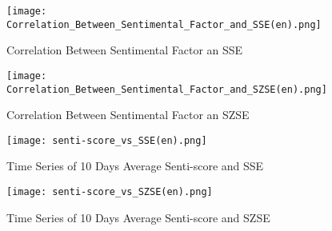 \documentclass[10pt, conference, compsocconf]{IEEEtran}
\begin{document}
\newpage
\begin{figure}[ht]
\begin{minipage}[t]{1\linewidth}
\centering
\texttt{[image: Correlation\_Between\_Sentimental\_Factor\_and\_SSE(en).png]}
\caption{Correlation Between Sentimental Factor an SSE}
\label{fig:side:a}
\end{minipage}%
\begin{minipage}[t]{1\linewidth}
\centering
\texttt{[image: Correlation\_Between\_Sentimental\_Factor\_and\_SZSE(en).png]}
\caption{Correlation Between Sentimental Factor an SZSE}
\label{fig:side:b}
\end{minipage}
\end{figure}
\begin{figure*}[ht]
\centering
\texttt{[image: senti-score\_vs\_SSE(en).png]}
\caption{Time Series of 10 Days Average Senti-score and SSE}
\end{figure*}
\begin{figure*}[ht]
\centering
\texttt{[image: senti-score\_vs\_SZSE(en).png]}
\caption{Time Series of 10 Days Average Senti-score and SZSE}
\end{figure*}
\end{document}
